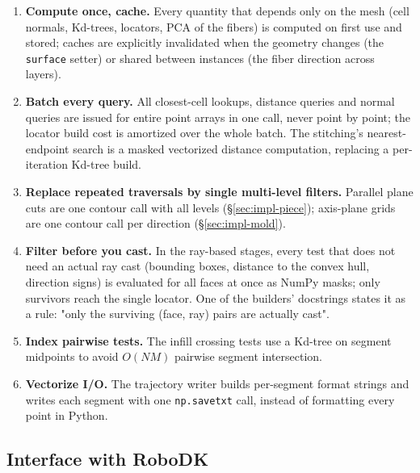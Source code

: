 \begin{enumerate}
  \item \textbf{Compute once, cache.} Every quantity that depends only
        on the mesh (cell normals, Kd-trees, locators, PCA of the
        fibers) is computed on first use and stored; caches are
        explicitly invalidated when the geometry changes (the
        \texttt{surface} setter) or shared between instances (the
        fiber direction across layers).
  \item \textbf{Batch every query.} All closest-cell lookups, distance
        queries and normal queries are issued for entire point arrays
        in one call, never point by point; the locator build cost is
        amortized over the whole batch. The stitching's
        nearest-endpoint search is a masked vectorized distance
        computation, replacing a per-iteration Kd-tree build.
  \item \textbf{Replace repeated traversals by single multi-level
        filters.} Parallel plane cuts are one contour call with all
        levels (\S\ref{sec:impl-piece}); axis-plane grids are one
        contour call per direction (\S\ref{sec:impl-mold}).
  \item \textbf{Filter before you cast.} In the ray-based stages, every
        test that does not need an actual ray cast (bounding boxes,
        distance to the convex hull, direction signs) is evaluated for
        all faces at once as NumPy masks; only survivors reach the
        single locator. One of the builders' docstrings states it as a
        rule: "only the surviving (face, ray) pairs are actually
        cast".
  \item \textbf{Index pairwise tests.} The infill crossing tests use a
        Kd-tree on segment midpoints to avoid $O(NM)$ pairwise
        segment intersection.
  \item \textbf{Vectorize I/O.} The trajectory writer builds per-segment
        format strings and writes each segment with one
        \texttt{np.savetxt} call, instead of formatting every point in
        Python.
\end{enumerate}

\subsection{Interface with RoboDK}\label{sec:impl-robodk}

